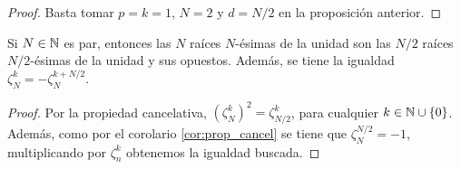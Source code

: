 \documentclass{article}
\begin{document}
\begin{proof}
    Basta tomar $p = k =1$, $N = 2$ y $d = N/2$ en la proposición anterior.
\end{proof}

\begin{lem} \label{lem:biseccion}
    Si $N \in \mathbb{N}$ es par, entonces las $N$ raíces $N$-ésimas de la unidad son las $N/2$ raíces $N/2$-ésimas de la unidad y sus opuestos. Además, se tiene la igualdad $\zeta_N^k = - \zeta_N^{k+N/2}$.
\end{lem}

\begin{proof}
    Por la propiedad cancelativa, $(\zeta_{N}^k)^2 = \zeta_{N/2}^k$, para cualquier $k \in \mathbb{N}\cup\{0\}$.
    Además, como por el corolario \ref{cor:prop_cancel} se tiene que $\zeta_N^{N/2} = -1$, multiplicando por $\zeta_n^k$ obtenemos la igualdad buscada.
\end{proof}
\end{document}
